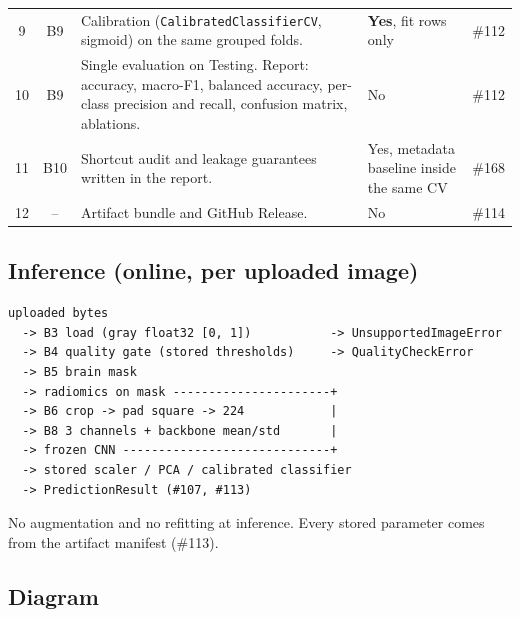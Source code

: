 \documentclass[11pt,a4paper]{article}
\newcommand{\board}[1]{\textsf{\##1}}
\begin{document}
\begin{longtable}{@{}c c p{7.2cm} p{2.4cm} p{1.9cm}@{}}
9  & B9 & Calibration (\texttt{CalibratedClassifierCV}, sigmoid) on the same grouped folds. & \textbf{Yes}, fit rows only & \board{112} \\
10 & B9 & Single evaluation on Testing. Report: accuracy, macro-F1, balanced accuracy, per-class precision and recall, confusion matrix, ablations. & No & \board{112} \\
11 & B10 & Shortcut audit and leakage guarantees written in the report. & Yes, metadata baseline inside the same CV & \board{168} \\
12 & -- & Artifact bundle and GitHub Release. & No & \board{114} \\
\bottomrule
\end{longtable}

\subsection{Inference (online, per uploaded image)}

\begin{Verbatim}[fontsize=\small, frame=single]
uploaded bytes
  -> B3 load (gray float32 [0, 1])           -> UnsupportedImageError
  -> B4 quality gate (stored thresholds)     -> QualityCheckError
  -> B5 brain mask
  -> radiomics on mask ----------------------+
  -> B6 crop -> pad square -> 224            |
  -> B8 3 channels + backbone mean/std       |
  -> frozen CNN -----------------------------+
  -> stored scaler / PCA / calibrated classifier
  -> PredictionResult (#107, #113)
\end{Verbatim}

No augmentation and no refitting at inference. Every stored parameter comes from the artifact manifest (\board{113}).

\subsection{Diagram}
\end{document}
